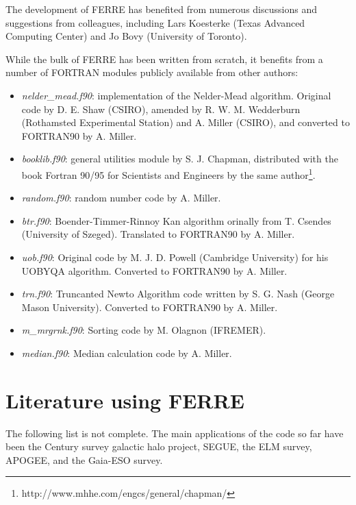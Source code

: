 \documentclass[12pt]{article}
\begin{document}
The development of FERRE has benefited from numerous discussions and suggestions
from colleagues, including 
Lars Koesterke (Texas Advanced Computing Center) and Jo Bovy (University of Toronto).

While the bulk of FERRE has been written from scratch, it benefits from a number of FORTRAN
modules publicly available from other authors:

\begin{itemize}
\item {\it nelder\_mead.f90}: implementation of the Nelder-Mead algorithm. 
Original code by D. E. Shaw (CSIRO), amended by R. W. M. Wedderburn
 (Rothamsted Experimental Station) and A. Miller (CSIRO), and converted to FORTRAN90 by
 A. Miller.

\item {\it booklib.f90}: general utilities module by S. J. Chapman, distributed with the book 
Fortran 90/95 for Scientists and Engineers by the same author\footnote{http://www.mhhe.com/engcs/general/chapman/}.

\item {\it random.f90}: random number code by A. Miller.

\item {\it btr.f90}: Boender-Timmer-Rinnoy Kan algorithm orinally from T. Csendes (University of Szeged).
Translated to FORTRAN90 by A. Miller.

\item {\it uob.f90}: Original code by M. J. D. Powell (Cambridge University) for his UOBYQA algorithm. 
Converted to FORTRAN90 by A. Miller.

\item {\it trn.f90}: Truncanted Newto Algorithm code written by S. G. Nash (George Mason University).
Converted to FORTRAN90 by A. Miller.

\item {\it m\_mrgrnk.f90}: Sorting code by M. Olagnon (IFREMER).

\item {\it median.f90}: Median calculation code by A. Miller.
\end{itemize}

\section{Literature using FERRE}
\label{literature}

The following list is not complete. The main applications of the code so far 
have been the Century survey galactic halo project, SEGUE, the ELM survey, 
APOGEE, and the Gaia-ESO survey.
\end{document}
